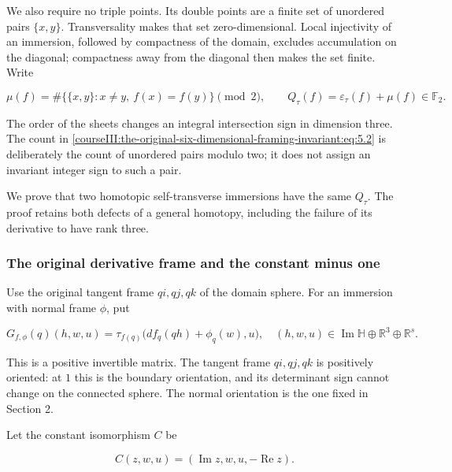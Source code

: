 We also require no triple points. Its double points are a finite set of unordered pairs \(\{x,y\}\). Transversality makes that set zero-dimensional. Local injectivity of an immersion, followed by compactness of the domain, excludes accumulation on the diagonal; compactness away from the diagonal then makes the set finite. Write

\begin{equation}
\mu(f)=\#\{\{x,y\}:x\ne y,\ f(x)=f(y)\}\pmod2,\qquad
 Q_\tau(f)=\varepsilon_\tau(f)+\mu(f)\in\mathbb F_2.
 \label{courseIII:the-original-six-dimensional-framing-invariant:eq:5.2}
\end{equation}

The order of the sheets changes an integral intersection sign in dimension three. The count in \eqref{courseIII:the-original-six-dimensional-framing-invariant:eq:5.2} is deliberately the count of unordered pairs modulo two; it does not assign an invariant integer sign to such a pair.

We prove that two homotopic self-transverse immersions have the same \(Q_\tau\). The proof retains both defects of a general homotopy, including the failure of its derivative to have rank three.

\subsubsection{The original derivative frame and the constant minus one}
\label{courseIII:the-original-six-dimensional-framing-invariant:section-5.1}

Use the original tangent frame \(qi,qj,qk\) of the domain sphere. For an immersion with normal frame \(\phi\), put

\begin{equation}
G_{f,\phi}(q)(h,w,u)
   =\tau_{f(q)}\bigl(df_q(qh)+\phi_q(w),u\bigr),
 \quad
 (h,w,u)\in\operatorname{Im}\mathbb H\oplus\mathbb R^3
                    \oplus\mathbb R^s.
 \label{courseIII:the-original-six-dimensional-framing-invariant:eq:5.3}
\end{equation}

This is a positive invertible matrix. The tangent frame \(qi,qj,qk\) is positively oriented: at \(1\) this is the boundary orientation, and its determinant sign cannot change on the connected sphere. The normal orientation is the one fixed in Section 2.

Let the constant isomorphism \(C\) be

\begin{equation}
C(z,w,u)=(\operatorname{Im}z,w,u,-\operatorname{Re}z).
 \label{courseIII:the-original-six-dimensional-framing-invariant:eq:5.4}
\end{equation}

